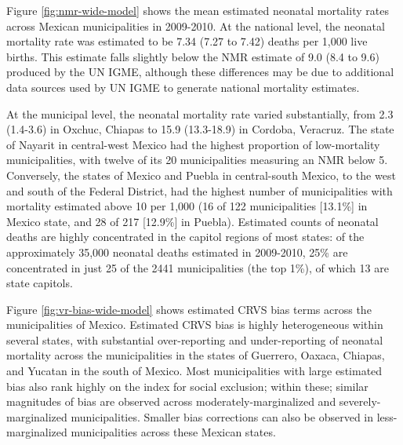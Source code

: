 \documentclass[
]{article}
\begin{document}
Figure \ref{fig:nmr-wide-model} shows the mean estimated neonatal mortality rates across Mexican municipalities in 2009-2010. At the national level, the neonatal mortality rate was estimated to be 7.34 (7.27 to 7.42) deaths per 1,000 live births. This estimate falls slightly below the NMR estimate of 9.0 (8.4 to 9.6) produced by the UN IGME, although these differences may be due to additional data sources used by UN IGME to generate national mortality estimates.

At the municipal level, the neonatal mortality rate varied substantially, from 2.3 (1.4-3.6) in Oxchuc, Chiapas to 15.9 (13.3-18.9) in Cordoba, Veracruz. The state of Nayarit in central-west Mexico had the highest proportion of low-mortality municipalities, with twelve of its 20 municipalities measuring an NMR below 5. Conversely, the states of Mexico and Puebla in central-south Mexico, to the west and south of the Federal District, had the highest number of municipalities with mortality estimated above 10 per 1,000 (16 of 122 municipalities {[}13.1\%{]} in Mexico state, and 28 of 217 {[}12.9\%{]} in Puebla). Estimated counts of neonatal deaths are highly concentrated in the capitol regions of most states: of the approximately 35,000 neonatal deaths estimated in 2009-2010, 25\% are concentrated in just 25 of the 2441 municipalities (the top 1\%), of which 13 are state capitols.

Figure \ref{fig:vr-bias-wide-model} shows estimated CRVS bias terms across the municipalities of Mexico. Estimated CRVS bias is highly heterogeneous within several states, with substantial over-reporting and under-reporting of neonatal mortality across the municipalities in the states of Guerrero, Oaxaca, Chiapas, and Yucatan in the south of Mexico. Most municipalities with large estimated bias also rank highly on the index for social exclusion; within these; similar magnitudes of bias are observed across moderately-marginalized and severely-marginalized municipalities. Smaller bias corrections can also be observed in less-marginalized municipalities across these Mexican states.
\end{document}
